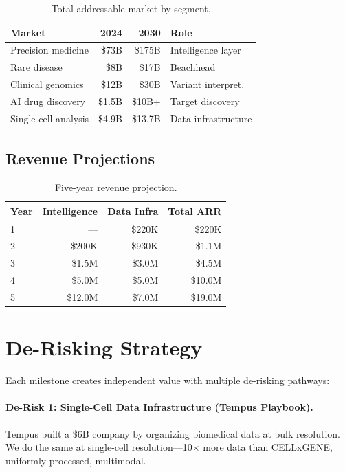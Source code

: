 \documentclass[10pt,twocolumn,letterpaper]{article}
\begin{document}
\begin{table}[h]
\centering
\small
\begin{tabular}{@{}lrrl@{}}
\toprule
\textbf{Market} & \textbf{2024} & \textbf{2030} & \textbf{Role} \\
\midrule
Precision medicine & \$73B & \$175B & Intelligence layer \\
Rare disease & \$8B & \$17B & Beachhead \\
Clinical genomics & \$12B & \$30B & Variant interpret. \\
AI drug discovery & \$1.5B & \$10B+ & Target discovery \\
Single-cell analysis & \$4.9B & \$13.7B & Data infrastructure \\
\bottomrule
\end{tabular}
\caption{Total addressable market by segment.}
\label{tab:tam}
\end{table}

\subsection{Revenue Projections}

\begin{table}[h]
\centering
\small
\begin{tabular}{@{}lrrr@{}}
\toprule
\textbf{Year} & \textbf{Intelligence} & \textbf{Data Infra} & \textbf{Total ARR} \\
\midrule
1 & --- & \$220K & \$220K \\
2 & \$200K & \$930K & \$1.1M \\
3 & \$1.5M & \$3.0M & \$4.5M \\
4 & \$5.0M & \$5.0M & \$10.0M \\
5 & \$12.0M & \$7.0M & \$19.0M \\
\bottomrule
\end{tabular}
\caption{Five-year revenue projection.}
\label{tab:revenue}
\end{table}

\section{De-Risking Strategy}
\label{sec:derisk}

Each milestone creates independent value with multiple de-risking pathways:

\paragraph{De-Risk 1: Single-Cell Data Infrastructure (Tempus Playbook).}
Tempus built a \$6B company by organizing biomedical data at bulk resolution.
We do the same at single-cell resolution---10$\times$ more data than CELLxGENE,
uniformly processed, multimodal.
\end{document}
